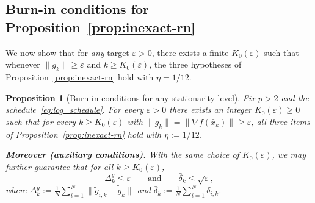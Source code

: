 \documentclass[10pt,twocolumn,letterpaper]{article}
\theoremstyle{compact}
\newtheorem{proposition}[theorem]{Proposition}
\theoremstyle{compactremark}
\begin{document}
\subsection{Burn-in conditions for Proposition~\ref{prop:inexact-rn}}

We now show that for \emph{any} target $\varepsilon>0$, there exists a finite
$K_0(\varepsilon)$ such that whenever $\|g_k\|\ge\varepsilon$ and $k\ge K_0(\varepsilon)$,
the three hypotheses of Proposition~\ref{prop:inexact-rn} hold with $\eta=1/12$.
\begin{proposition}[Burn-in conditions for any stationarity level]\label{prop:burnin}
Fix $p>2$ and the schedule~\eqref{eq:log_schedule}.
For every $\varepsilon>0$ there exists an integer $K_0(\varepsilon)\ge0$ such that
for every $k\ge K_0(\varepsilon)$ with $\|g_k\|=\|\nabla f(\bar x_k)\|\ge \varepsilon$,
all three items of Proposition~\ref{prop:inexact-rn} hold with $\eta:=1/12$.

\vspace{1pt}
\noindent\textbf{Moreover (auxiliary conditions).}
With the same choice of $K_0(\varepsilon)$, we may further guarantee that for all $k\ge K_0(\varepsilon)$,
\begin{equation}\label{eq:burnin_aux_enforce}
\Delta_k^g \le \varepsilon
\qquad\text{and}\qquad
\bar\delta_k \le \sqrt{\varepsilon},
\end{equation}
where $\Delta_k^g:=\frac1N\sum_{i=1}^N\|\tilde g_{i,k}-\tilde{\bar g}_k\|$ and $\bar\delta_k:=\frac1N\sum_{i=1}^N\delta_{i,k}$.
\end{proposition}
\end{document}
